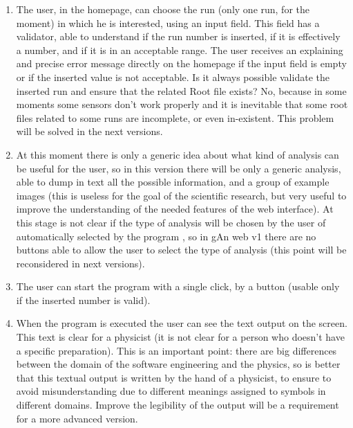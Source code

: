 \begin{enumerate}

\item The user, in the homepage, can choose the run (only one run, for the moment) in which he is interested, using an input field. This field has a validator, able to understand if the run number is inserted, if it is effectively a number, and if it is in an acceptable range. The user receives an explaining and precise error message directly on the homepage if the input field is empty or if the inserted value is not acceptable. Is it always possible validate the inserted run and ensure that the related Root file exists? No, because in some moments some sensors don't work properly and it is inevitable that some root files related to some runs are incomplete, or even in-existent. This problem will be solved in the next versions.

\item At this moment there is only a generic idea about what kind of analysis can be useful for the user, so in this version there will be only a generic analysis, able to dump in text all the possible information, and a group of example images (this is useless for the goal of the scientific research, but very useful to improve the understanding of the needed features of the web interface).
At this stage is not clear if the type of analysis will be chosen by the user of automatically selected by the program , so in gAn web v1 there are no buttons able to allow the user to select the type of analysis (this point will be reconsidered in next versions).

\item The user can start the program with a single click, by a button (usable only if the inserted number is valid).

\item When the program is executed the user can see the text output on the screen. This text is clear for a physicist (it is not clear for a person who doesn't have a specific preparation). This is an important point: there are big differences between the domain of the software engineering and the physics, so is better that this textual output is written by the hand of a physicist, to ensure to avoid misunderstanding due to different meanings assigned to symbols in different domains. Improve the legibility of the output will be a requirement for a more advanced version. 


\end{enumerate}
